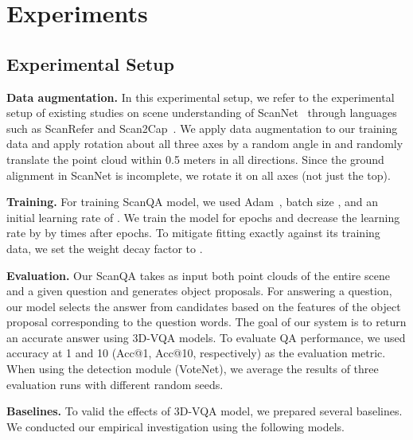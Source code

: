 \section{Experiments}


\subsection{Experimental Setup}
\noindent \textbf{Data augmentation.} In this experimental setup, we refer to the experimental setup of existing studies on scene understanding of ScanNet~\cite{dai2017scannet}
through languages such as ScanRefer and Scan2Cap~\cite{chen2020scanrefer,chen2021scan2cap}.
We apply data augmentation to our training data and apply rotation about all three axes by a random angle in and randomly translate the point cloud within 0.5 meters in all directions. Since the ground alignment in ScanNet is incomplete, we rotate it on all axes (not just the top).




\noindent \textbf{Training.}
For training ScanQA model, we used Adam~\cite{kingma2014adam}, batch size , and an initial learning rate of .
We train the model for  epochs and decrease the learning rate by by  times after  epochs.
To mitigate fitting exactly against its training data, we set the weight decay factor to .

\noindent \textbf{Evaluation.}
Our ScanQA takes as input both point clouds of the entire scene and a given question and generates object proposals.
For answering a question, our model selects the answer from candidates based on the features of the object proposal corresponding to the question words.
The goal of our system is to return an accurate answer using 3D-VQA models.
To evaluate QA performance, we used accuracy at 1 and 10 (Acc@1, Acc@10, respectively) as the evaluation metric.
When using the detection module (VoteNet), we average the results of three evaluation runs with different random seeds.


\noindent \textbf{Baselines.}
To valid the effects of 3D-VQA model, we prepared several baselines.
We conducted our empirical investigation using the following models.

